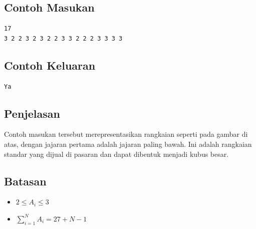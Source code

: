 \documentclass{article}
\begin{document}
\subsection*{Contoh Masukan}

\begin{lstlisting}
17
3 2 2 3 2 3 2 2 3 3 2 2 2 3 3 3 3
\end{lstlisting}

\subsection*{Contoh Keluaran}

\begin{lstlisting}
Ya
\end{lstlisting}

\subsection*{Penjelasan}

\par\noindent Contoh masukan tersebut merepresentasikan rangkaian seperti pada gambar di atas, dengan jajaran pertama adalah jajaran paling bawah. Ini adalah rangkaian standar yang dijual di pasaran dan dapat dibentuk menjadi kubus besar.

\subsection*{Batasan}

\begin{itemize}
	\item $2 \leq A_i \leq 3$
	\item $\sum_{i=1}^{N} A_i = 27 + N - 1$
\end{itemize}
\end{document}
